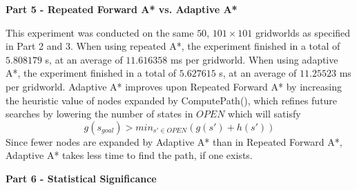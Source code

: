 \documentclass[11pt]{article}
\begin{document}
    \begin{center}
        \Large
        \textbf{Part 5 - Repeated Forward A* vs. Adaptive A*}
    \end{center}
    \normalsize
    This experiment was conducted on the same $50$, $101 \times 101$ gridworlds as specified in Part 2 and 3.
    When using repeated A*, the experiment finished in a total of $5.808179$ s, at an average of $11.616358$ ms per gridworld.
    When using adaptive A*, the experiment finished in a total of $5.627615$ s, at an average of $11.25523$ ms per gridworld.
    \newline\newline
    Adaptive A* improves upon Repeated Forward A* by increasing the heuristic value of nodes expanded by ComputePath(), which refines
    future searches by lowering the number of states in $OPEN$ which will satisfy \[g(s_{goal}) > min_{s'\in OPEN}\left(g(s') + h(s')\right)\]
    Since fewer nodes are expanded by Adaptive A* than in Repeated Forward A*, Adaptive A* takes less time to find the path, if one exists.

    \begin{center}
        \Large
        \textbf{Part 6 - Statistical Significance}
    \end{center}
    \normalsize
    
    
\end{document}
